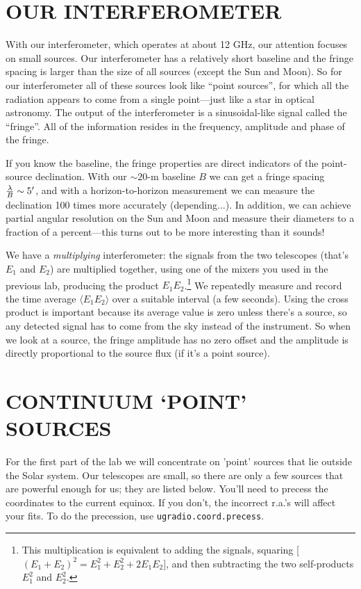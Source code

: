 \documentclass[11pt,preprint]{aastex}
\begin{document}
\section{OUR INTERFEROMETER}

	With our interferometer, which operates at about 12 GHz, our
attention focuses on small sources.  Our interferometer has a relatively
short baseline and the fringe spacing is larger than the size of all
sources (except the Sun and Moon).  So for our interferometer all of
these sources look like ``point sources'', for which all the radiation
appears to come from a single point---just like a star in optical
astronomy.  The output of the interferometer is a sinusoidal-like signal
called the ``fringe''. All of the information resides in the frequency,
amplitude and phase of the fringe.

 If you know the baseline, the fringe properties are direct indicators
 of the point-source declination.  With our $\sim 20$-m baseline $B$ we
 can get a fringe spacing ${\lambda \over B}\sim 5'$, and with a
 horizon-to-horizon measurement we can measure the declination 100 times
 more accurately (depending...).  In addition, we can achieve partial
 angular resolution on the Sun and Moon and measure their diameters to a
 fraction of a percent---this turns out to be more interesting than it
 sounds!

We have a {\it multiplying} interferometer: the signals from the two
telescopes (that's $E_1$ and $E_2$) are multiplied together, using one
of the mixers you used in the previous lab, producing the product
$E_1E_2$.\footnote{This multiplication is equivalent to adding the
signals, squaring [$(E_1 + E_2)^2 = E_1^2 + E_2^2 + 2E_1E_2$], and then
subtracting the two self-products $E_1^2$ and $E_2^2$.} We repeatedly
measure and record the time average $\langle E_1E_2 \rangle$ over a
suitable interval (a few seconds). Using the cross product is important
because its average value is zero unless there's a source, so any
detected signal has to come from the sky instead of the instrument.  So
when we look at a source, the fringe amplitude has no zero offset and
the amplitude is directly proportional to the source flux (if it's a
point source).


\section {CONTINUUM `POINT' SOURCES}

For the first part of the lab we will concentrate on 'point' sources
that lie outside the Solar system. Our telescopes are small, so there
are only a few sources that are powerful enough for us; they are listed
below.  You'll need to precess the coordinates to the current
equinox. If you don't, the incorrect r.a.'s will affect your fits. To do
the precession, use {\tt ugradio.coord.precess}.
\end{document}
